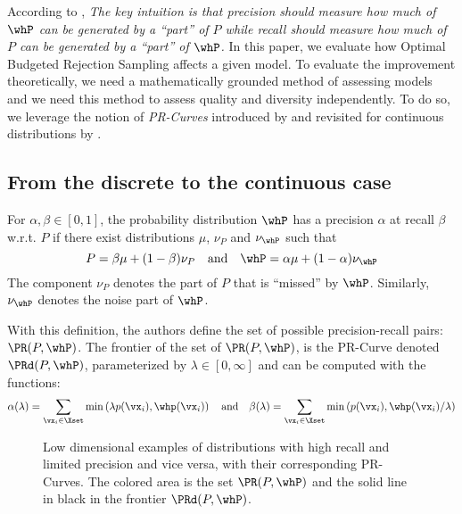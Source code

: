 \documentclass[twoside]{article}
\begin{document}
According to \cite{sajjadi_assessing_2018}, \emph{The key intuition is that precision should measure how much of $\whP$ can be generated by a “part” of $P$ while recall should measure how much of $P$ can be generated by a “part” of $\whP$.}
In this paper, we evaluate how Optimal Budgeted Rejection Sampling affects a given model. To evaluate the improvement theoretically, we need a mathematically grounded method of assessing models and we need this method to assess quality and diversity independently. To do so, we leverage the notion of \emph{PR-Curves} introduced by \cite{sajjadi_assessing_2018} and revisited for continuous distributions by \cite{simon_revisiting_2019}.

\subsection{From the discrete to the continuous case}

\begin{definition}
For $\alpha, \beta \in[0,1]$,  the probability distribution $\whP$ has a precision $\alpha$ at recall $\beta$ w.r.t. $P$ if there exist distributions $\mu$, $\nu_P$ and $\nu_{\whP}$ such that
$$
P = \beta \mu +(1-\beta)\nu_P \quad \mbox{and}\quad \whP = \alpha \mu + (1-\alpha )\nu_{\whP}
$$
The component $\nu_P$ denotes the part of $P$ that is “missed” by $\whP$. Similarly, $\nu_{\whP}$ denotes the noise part of $\whP$.\quad
\end{definition}

With this definition, the authors define the set of possible precision-recall pairs: $\PR(P, \whP)$. The frontier of  the set of $\PR(P, \whP)$, is the PR-Curve denoted $\PRd(P, \whP)$, parameterized by $\lambda\in[0, \infty]$ and can be computed with the functions:
\begin{align*}
    \alpha(\lambda) = \sum_{\vx_i\in\Xset} \min\left(\lambda p(\vx_i), \whp(\vx_i) \right) \quad \mbox{and} \quad  \beta(\lambda) =  \sum_{\vx_i\in\Xset} \min\left( p(\vx_i), \whp(\vx_i)/\lambda \right) 
\end{align*}


\begin{figure}[H]

 \hfill
\caption{Low dimensional examples of distributions with high recall and limited precision and vice versa, with their corresponding PR-Curves. The colored area is the set $\PR(P, \whP)$ and the solid line in black in the frontier $\PRd(P, \whP)$.}
\end{figure}
\end{document}
